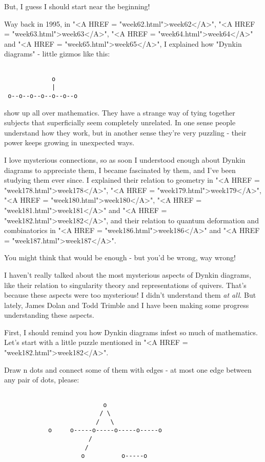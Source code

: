 But, I guess I should start near the beginning!

Way back in 1995, in "<A HREF = "week62.html">week62</A>", "<A HREF = "week63.html">week63</A>", "<A HREF = "week64.html">week64</A>" and "<A HREF = "week65.html">week65</A>", 
I explained how "Dynkin diagrams" - little gizmos like this:


\begin{verbatim}

             o
             |
 o--o--o--o--o--o--o
\end{verbatim}
    
show up all over mathematics.  They have a strange way of tying 
together subjects that superficially seem completely unrelated.
In one sense people understand how they work, but in another sense
they're very puzzling - their power keeps growing in unexpected ways.  

I love mysterious connections, so as soon I understood enough about
Dynkin diagrams to appreciate them, I became fascinated by them, 
and I've been studying them ever since.  I explained their relation
to geometry in "<A HREF = "week178.html">week178</A>", "<A HREF = "week179.html">week179</A>", "<A HREF = "week180.html">week180</A>", "<A HREF = "week181.html">week181</A>" and "<A HREF = "week182.html">week182</A>",
and their relation to quantum deformation and combinatorics in 
"<A HREF = "week186.html">week186</A>" and "<A HREF = "week187.html">week187</A>".  

You might think that would be enough - but you'd be wrong, way wrong!  

I haven't really talked about the most mysterious aspects of Dynkin 
diagrams, like their relation to singularity theory and representations
of quivers.  That's because these aspects were too mysterious!  
I didn't understand them \emph{at all}.  But lately, James Dolan and Todd 
Trimble and I have been making some progress understanding these aspects.  

First, I should remind you how Dynkin diagrams infest so much of
mathematics.  Let's start with a little puzzle mentioned in "<A HREF = "week182.html">week182</A>".

Draw n dots and connect some of them with edges - at most one edge 
between any pair of dots, please:


\begin{verbatim}

                           o
                          / \
                         /   \
            o     o-----o-----o-----o-----o
                       /
                      /
                     o          o-----o

\end{verbatim}
    
